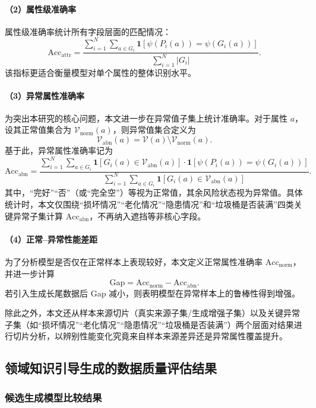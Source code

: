 \paragraph{（2）属性级准确率}
属性级准确率统计所有字段层面的匹配情况：
\[
\mathrm{Acc}_{\mathrm{attr}}=
\frac{\sum_{i=1}^{N}\sum_{a\in G_i}\mathbf{1}[\psi(P_i(a))=\psi(G_i(a))]}
{\sum_{i=1}^{N}|G_i|}.
\]
该指标更适合衡量模型对单个属性的整体识别水平。

\paragraph{（3）异常属性准确率}
为突出本研究的核心问题，本文进一步在异常值子集上统计准确率。对于属性 $a$，设其正常值集合为 $\mathcal{V}_{\mathrm{norm}}(a)$，则异常值集合定义为
\[
\mathcal{V}_{\mathrm{abn}}(a)=\mathcal{V}(a)\setminus \mathcal{V}_{\mathrm{norm}}(a).
\]
基于此，异常属性准确率记为
\[
\mathrm{Acc}_{\mathrm{abn}}=
\frac{\sum_{i=1}^{N}\sum_{a\in G_i}\mathbf{1}[G_i(a)\in\mathcal{V}_{\mathrm{abn}}(a)]\cdot \mathbf{1}[\psi(P_i(a))=\psi(G_i(a))]}
{\sum_{i=1}^{N}\sum_{a\in G_i}\mathbf{1}[G_i(a)\in\mathcal{V}_{\mathrm{abn}}(a)]}.
\]
其中，“完好”“否”（或“完全空”）等视为正常值，其余风险状态视为异常值。具体统计时，本文仅围绕“损坏情况”“老化情况”“隐患情况”和“垃圾桶是否装满”四类关键异常子集计算 $\mathrm{Acc}_{\mathrm{abn}}$，不再纳入遮挡等非核心字段。

\paragraph{（4）正常--异常性能差距}
为了分析模型是否仅在正常样本上表现较好，本文定义正常属性准确率 $\mathrm{Acc}_{\mathrm{norm}}$，并进一步计算
\[
\mathrm{Gap}=\mathrm{Acc}_{\mathrm{norm}}-\mathrm{Acc}_{\mathrm{abn}}.
\]
若引入生成长尾数据后 Gap 减小，则表明模型在异常样本上的鲁棒性得到增强。

除此之外，本文还从样本来源切片（真实来源子集/生成增强子集）以及关键异常子集（如“损坏情况”“老化情况”“隐患情况”“垃圾桶是否装满”）两个层面对结果进行切片分析，以辨别性能变化究竟来自样本来源差异还是异常属性覆盖提升。

\subsection{领域知识引导生成的数据质量评估结果}

\subsubsection{候选生成模型比较结果}

